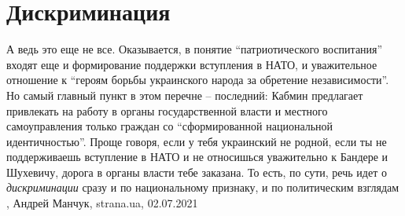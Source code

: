  
 
 
 
 
\chapter{Дискриминация}
\label{sec:slova.diskriminacia}

А ведь это еще не все. Оказывается, в понятие \enquote{патриотического воспитания}
входят еще и формирование поддержки вступления в НАТО, и уважительное отношение
к \enquote{героям борьбы украинского народа за обретение независимости}.  Но самый
главный пункт в этом перечне – последний: Кабмин предлагает привлекать на
работу в органы государственной власти и местного самоуправления только граждан
со \enquote{сформированной национальной идентичностью}. Проще говоря, если у тебя
украинский не родной, если ты не поддерживаешь вступление в НАТО и не
относишься уважительно к Бандере и Шухевичу, дорога в органы власти тебе
заказана.  То есть, по сути, речь идет о \emph{дискриминации} сразу и по национальному
признаку, и по политическим взглядам
, 
Андрей Манчук, strana.ua, 02.07.2021

